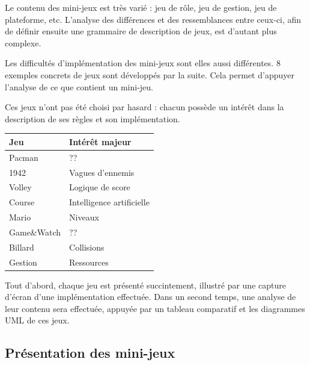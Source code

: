 
Le contenu des mini-jeux est très varié : jeu de rôle, jeu de gestion, jeu de plateforme, etc.
L'analyse des différences et des ressemblances entre ceux-ci, afin de définir ensuite une grammaire de description de jeux, est d'autant plus complexe.

Les difficultés d'implémentation des mini-jeux sont elles aussi différentes.
8 exemples concrets de jeux sont développés par la suite.
Cela permet d'appuyer l'analyse de ce que contient un mini-jeu.

Ces jeux n'ont pas été choisi par hasard : chacun possède un intérêt dans la description de ses règles et son implémentation. 

\vspace{0.5cm}

\begin{tabular}{l|l}
 Jeu & Intérêt majeur \\
 \hline
 Pacman & ?? \\
 1942 & Vagues d'ennemis \\
 Volley & Logique de score \\
 Course & Intelligence artificielle \\
 Mario & Niveaux \\
 Game\&Watch & ?? \\
 Billard & Collisions \\
 Gestion & Ressources \\
\end{tabular}

\vspace{0.5cm}

Tout d'abord, chaque jeu est présenté succintement, illustré par une capture d'écran d'une implémentation effectuée.
Dans un second temps, une analyse de leur contenu sera effectuée, appuyée par un tableau comparatif et les diagrammes UML de ces jeux.

\clearpage

\subsection{Présentation des mini-jeux}


